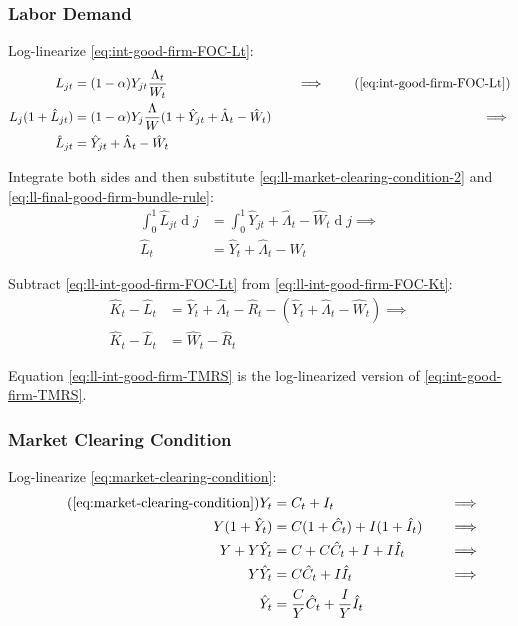 \documentclass[
	12pt, 
	]{article}
\numberwithin{equation}{section}
\DeclareMathOperator{\dif}{d}
\theoremstyle{definition}
\theoremstyle{plain}
\theoremstyle{plain}
\theoremstyle{plain}
\begin{document}

\subsubsection{Labor Demand}

Log-linearize \ref{eq:int-good-firm-FOC-Lt}:
\begin{alignat}{2}
	L_{jt} &= (1-\alpha) Y_{jt} \frac{\Lambda_t}{W_t} &\implies \tag{\ref{eq:int-good-firm-FOC-Lt}} \\
	L_j (1+ \hat{L}_{jt}) &= (1-\alpha) Y_{j} \frac{\Lambda}{W} (1+ \hat{Y}_{jt} +\hat{\Lambda}_t -\hat{W}_t) \quad &\implies \nonumber \\
	\hat{L}_{jt} &= \hat{Y}_{jt} +\hat{\Lambda}_t -\hat{W}_t \nonumber
\end{alignat}

Integrate both sides and then substitute \ref{eq:ll-market-clearing-condition-2} and \ref{eq:ll-final-good-firm-bundle-rule}:
\begin{align}
	\int_{0}^{1} \hat{L}_{jt} \dif j &= \int_{0}^{1} \hat{Y}_{jt} + \hat{\Lambda}_t - \hat{W}_t \dif j \implies \nonumber \\
	\hat{L}_t &= \hat{Y}_t + \hat{\Lambda}_t - \hat{W}_t
	\label{eq:ll-int-good-firm-FOC-Lt}
\end{align}

Subtract \ref{eq:ll-int-good-firm-FOC-Lt} from \ref{eq:ll-int-good-firm-FOC-Kt}:
\begin{align}
	\hat{K}_t - \hat{L}_t &= \hat{Y}_t + \hat{\Lambda}_t - \hat{R}_t - (\hat{Y}_t + \hat{\Lambda}_t - \hat{W}_t) \implies \nonumber \\
	\hat{K}_t - \hat{L}_t &= \hat{W}_t - \hat{R}_t \label{eq:ll-int-good-firm-TMRS}
\end{align}

Equation \ref{eq:ll-int-good-firm-TMRS} is the log-linearized version of \ref{eq:int-good-firm-TMRS}.


\subsubsection{Market Clearing Condition}

Log-linearize \ref{eq:market-clearing-condition}:
\begin{alignat}{2}
\tag{\ref{eq:market-clearing-condition}}
	Y_t &= C_t + I_t &\implies \\
	Y (1+ \hat{Y}_t) &= C(1+ \hat{C}_t) + I (1+ \hat{I}_t) \quad &\implies \nonumber \\
	Y + Y\hat{Y}_t &= C + C\hat{C}_t + I + I\hat{I}_t &\implies \nonumber  \\
	Y\hat{Y}_t &= C\hat{C}_t + I\hat{I}_t &\implies \nonumber \\
	\hat{Y}_t &= \frac{C}{Y}\hat{C}_t + \frac{I}{Y}\hat{I}_t  \label{eq:ll-market-clearing-condition}
\end{alignat}
\end{document}
